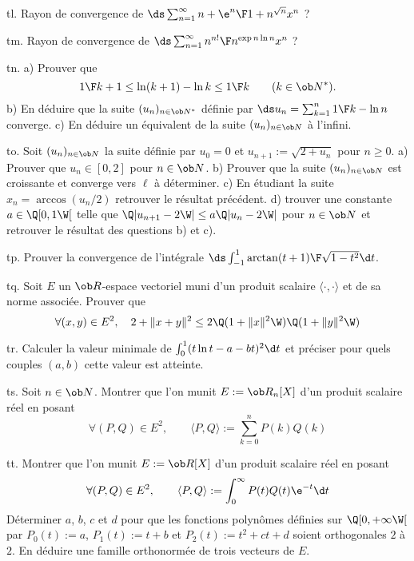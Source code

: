 \exo [Level=2,Fight=0,Learn=0,Type=\Exercices,Field=\SériesEntières,Origin=] tl. 
Rayon de convergence de $\ds\sum_{n=1}^\infty {n+\e^n\F1+ n^{\sqrt n}}x^n$ ?

\exo [Level=2,Fight=0,Learn=0,Type=\Exercices,Field=\SériesEntières,Origin=] tm. 
Rayon de convergence de $\ds\sum_{n=1}^\infty{n^{n!}\F n^{\exp n\ln n}}x^n$ ? 

\exo [Level=2,Fight=0,Learn=0,Type=\Exercices,Field=\SériesNumériques,Origin=] tn. 
a) Prouver que
$$
{1\F k+1}\le \ln(k+1)-\ln k\le {1\F k}\qquad(k\in\ob N^*).
$$ 
b) En déduire que la suite $(u_n)_{n\in\ob N^*}$ 
définie par $\ds u_n=\sum_{k=1}^n{1\F k}-\ln n$ converge. \pn
c) En déduire un équivalent de la suite $(u_n)_{n\in\ob N}$ à l'infini. 


\exo [Level=1,Fight=2,Learn=2,Type=\Exercices,Field=\Suites,Origin=] to. 
Soit $(u_n)_{n\in\ob N}$ la suite définie par $u_0=0$ et $u_{n+1}:=\sqrt{2+u_n}$ 
pour $n\ge0$. \pn
a) Prouver que $u_n\in[0,2]$ pour $n\in\ob N$. \pn
b) Prouver que la suite $(u_n)_{n\in\ob N}$ est croissante et converge vers $\ell$ à déterminer. \pn
c) En étudiant la suite $x_n=\arccos(u_n/2)$
retrouver le résultat précédent. \pn
d) trouver une constante $a\in\Q[0,1\W[$ telle que $\Q|u_{n+1}-2\W|\le a\Q|u_n-2\W|$ pour $n\in\ob N$  
et retrouver le résultat des questions b) et c). 

\exo [Level=2,Fight=0,Learn=0,Type=\Exercices,Field=\IntégralesGénéralisées,Origin=] tp. 
Prouver la convergence de l'intégrale $\ds \int_{-1}^1{\arctan(t+1)\F\sqrt{1-t^2}}\d t$. 

\exo [Level=1,Fight=1,Learn=0,Field=\EspacesPréHilbertiens,Type=\Exercices,Origin=] tq. 
Soit $E$ un $\ob R$-espace vectoriel 
muni d'un produit scalaire $\langle\cdot,\cdot\rangle$ et de sa norme associée. Prouver que 
$$
\forall (x,y)\in E^2,\quad 2+\|x+y\|^2\le2\Q(1+\|x\|^2\W)\Q(1+\|y\|^2\W)
$$
 
\exo [Level=2,Fight=1,Learn=0,Field=\Orthonormalisation,Type=\Exercices,Origin=] tr. 
Calculer la valeur minimale de $\int_0^1(t\ln t-a-bt)^2\d t$ et préciser 
pour quels couples $(a,b)$ cette valeur est atteinte. 

\exo [Level=1,Fight=1,Learn=1,Field=\EspacesPréHilbertiens,Type=\Exercices,Origin=] ts. 
Soit $n\in\ob N$. Montrer que l'on munit $E:=\ob R_n[X]$ 
d'un produit scalaire réel en posant 
$$
\forall(P,Q)\in E^2,\qquad\langle P, Q\rangle:=\sum_{k=0}^nP(k)Q(k)
$$ 

\exo [Level=2,Fight=1,Learn=0,Field=\Orthonormalisation,Type=\Exercices,Origin=] tt. 
Montrer que l'on munit $E:=\ob R[X]$ d'un produit scalaire réel en posant 
$$
\forall (P,Q)\in E^2,\qquad\langle P,Q\rangle:=\int_0^\infty P(t)Q(t)\e^{-t}\d t
$$
Déterminer $a$, $b$, $c$ et $d$ pour que les fonctions polynômes 
définies sur $\Q[0,+\infty\W[$ par $P_0(t):=a$, $P_1(t):=t+b$ 
et $P_2(t):= t^2+ct+d$ soient orthogonales $2$ à $2$. \pn
En déduire une famille orthonormée de trois vecteurs de $E$. 

